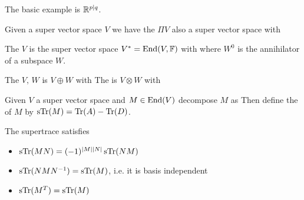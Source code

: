 \documentclass{article}
\begin{document}
\begin{example}
	The basic example is $\mathbb{R}^{p|q}$.
\end{example}

\begin{definition}
	Given a super vector space $V$ we have the  $\Pi V$ also a super vector space with 
\end{definition}

\begin{definition}
	The  $V$ is the super vector space $V^\ast = \operatorname{End}(V,\mathbb{F})$ with 
where $W^0$ is the annihilator of a subspace $W$. 
\end{definition}

\begin{definition}
	The  $V, \, W$ is $V \oplus W$ with
The  is $V \otimes W$ with 
\end{definition}

\begin{definition}
 Given $V$ a super vector space and $M \in \operatorname{End}(V)$ decompose $M$ as 
Then define the  of $M$ by $\operatorname{sTr}(M) = \operatorname{Tr}(A) - \operatorname{Tr}(D)$. 	
\end{definition}

\begin{prop}
	The supertrace satisfies 
	\begin{itemize}
		\item $\operatorname{sTr}(MN) = (-1)^{\left\lvert M \right\rvert\left\lvert N \right\rvert}\operatorname{sTr}(NM)$
		\item $\operatorname{sTr}(NMN^{-1}) = \operatorname{sTr}(M)$, i.e. it is basis independent
		\item $\operatorname{sTr}(M^T) = \operatorname{sTr}(M)$
	\end{itemize}
\end{prop}
\end{document}
